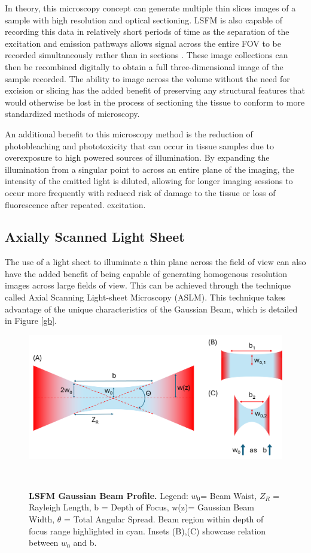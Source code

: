 In theory, this microscopy concept can generate multiple thin slices images of a sample with high resolution and optical sectioning. LSFM is also capable of recording this data in relatively short periods of time as the separation of the excitation and emission pathways allows signal across the entire FOV to be recorded simultaneously rather than in sections \cite{poola_light_2019}. These image collections can then be recombined digitally to obtain a full three-dimensional image of the sample recorded. The ability to image across the volume without the need for excision or slicing has the added benefit of preserving any structural features that would otherwise be lost in the process of sectioning the tissue to conform to more standardized methods of microscopy.

An additional benefit to this microscopy method is the reduction of photobleaching and phototoxicity that can occur in tissue samples due to overexposure to high powered sources of illumination. By expanding the illumination from a singular point to across an entire plane of the imaging, the intensity of the emitted light is diluted, allowing for longer imaging sessions to occur more frequently with reduced risk of damage to the tissue or loss of fluorescence after repeated. excitation.

\subsection{Axially Scanned Light Sheet}
The use of a light sheet to illuminate a thin plane across the field of view can also have the added benefit of being capable of generating homogenous resolution images across large fields of view. This can be achieved through the technique called Axial Scanning Light-sheet Microscopy (ASLM). This technique takes advantage of the unique characteristics of the Gaussian Beam, which is detailed in Figure \ref{gb}.

\begin{figure}[H]
    \centering
    \includegraphics[width=0.85\linewidth]{Figures/GaussianProfileDiagram.png}
    \caption{\textbf{LSFM Gaussian Beam Profile.} Legend: \(w_0\)= Beam Waist, \(Z_R\) = Rayleigh Length, b = Depth of Focus, w(z)= Gaussian Beam Width, \(\theta \) = Total Angular Spread. Beam region within depth of focus range highlighted in cyan. Insets (B),(C) showcase relation between $w_0$ and b.\cite{paschotta_gaussian_2005}}
    \label{fig:gb}\
\end{figure}

